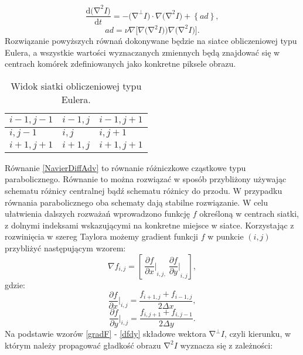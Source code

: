 \documentclass[a4paper,12pt,twoside,openany]{report}
\begin{document}
\begin{equation}
\frac{\mathrm{d}{\mathrm{(}\mathrm{\nabla }}^2I)}{\mathrm{d}t}=-{\mathrm{(}\mathrm{\nabla }}^{\bot }I)\cdot \nabla {\mathrm{(}\mathrm{\nabla }}^2I)+\left\{ad\right\}
\label{NavierDiffAdv}
,
\end{equation}
\begin{equation}
{ad}=\nu \nabla \Big[ \nabla 
\Big(\mathrm{\nabla }^2I)\Big)\nabla {\mathrm{(}\mathrm{\nabla }}^2I)\Big]
\label{NavierAdv}
.
\end{equation}
Rozwiązanie powyższych równań dokonywane będzie na siatce obliczeniowej typu Eulera, a wszystkie wartości wyznaczanych zmiennych będą znajdować się w centrach komórek zdefiniowanych jako konkretne piksele obrazu.
\begin{table}
\centering
\begin{tabular}{ ||P{2cm}|P{2cm}|P{2cm}|| } 
 \hline \hline
 $i-1, j-1$ & $i-1, j$ & $i-1, j+1$ \\ \hline
 $i, j-1$ & $i, j$ & $i, j+1$ \\ \hline
 $i+1, j+1$ & $i+1, j$ & $i+1, j+1$ \\ \hline \hline
\end{tabular}
\caption{Widok siatki obliczeniowej typu Eulera.}
\end{table}
Równanie \eqref{NavierDiffAdv} to równanie różniczkowe cząstkowe typu parabolicznego. Równanie to  można rozwiązać w sposób przybliżony używając schematu różnicy centralnej bądź schematu różnicy do przodu. W przypadku równania parabolicznego oba schematy dają stabilne rozwiązanie. W celu ułatwienia dalszych rozważań wprowadzono funkcję $f$ określoną w centrach siatki, z dolnymi indeksami wskazującymi na konkretne miejsce w siatce. Korzystając z rozwinięcia w szereg Taylora możemy gradient funkcji $f$ w punkcie $(i,j)$ przybliżyć następującym wzorem:
\begin{equation}
\nabla f_{i,j}=\left[\ {\frac{\partial f}{\partial x}\bigg |}_{i,j,} \ {\frac{\partial f}{\partial y}\bigg |}_{i,j}\right]
\label{gradF}
,
\end{equation}
gdzie:
\begin{equation}
{\frac{\partial f}{\partial x}} {\bigg |}_{i,j}=\frac{f_{i+1,j}+f_{i-1,j}}{2\Delta x}
\label{dfdx}
,
\end{equation}
\begin{equation}
{\frac{\partial f}{\partial y}} {\bigg |}_{i,j}=\frac{f_{i,j+1}+f_{i,j-1}}{2\Delta y}
\label{dfdy}
.
\end{equation}
Na podstawie wzorów \eqref{gradF} - \eqref{dfdy} składowe wektora ${\mathrm{\nabla }}^{\bot }I$, czyli kierunku, w którym należy propagować gładkość obrazu ${\mathrm{\nabla }}^2I$ wyznacza się z zależności:
\end{document}
